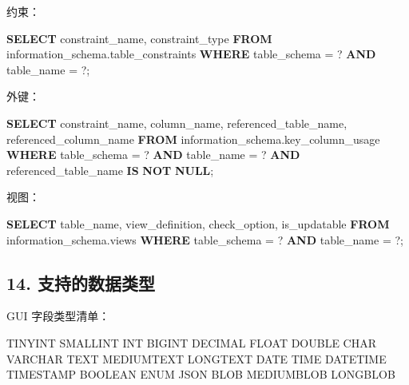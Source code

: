 \documentclass[
  a4paper,
  UTF8]{ctexart}
\newenvironment{Shaded}{}{}
\newcommand{\KeywordTok}[1]{\textcolor[rgb]{0.00,0.44,0.13}{\textbf{#1}}}
\newcommand{\NormalTok}[1]{#1}
\newcommand{\OperatorTok}[1]{\textcolor[rgb]{0.40,0.40,0.40}{#1}}
\begin{document}
约束：

\begin{Shaded}
\begin{Highlighting}[]
\KeywordTok{SELECT}
\NormalTok{  constraint\_name,}
\NormalTok{  constraint\_type}
\KeywordTok{FROM}\NormalTok{ information\_schema.table\_constraints}
\KeywordTok{WHERE}\NormalTok{ table\_schema }\OperatorTok{=}\NormalTok{ ?}
  \KeywordTok{AND}\NormalTok{ table\_name }\OperatorTok{=}\NormalTok{ ?;}
\end{Highlighting}
\end{Shaded}

外键：

\begin{Shaded}
\begin{Highlighting}[]
\KeywordTok{SELECT}
\NormalTok{  constraint\_name,}
\NormalTok{  column\_name,}
\NormalTok{  referenced\_table\_name,}
\NormalTok{  referenced\_column\_name}
\KeywordTok{FROM}\NormalTok{ information\_schema.key\_column\_usage}
\KeywordTok{WHERE}\NormalTok{ table\_schema }\OperatorTok{=}\NormalTok{ ?}
  \KeywordTok{AND}\NormalTok{ table\_name }\OperatorTok{=}\NormalTok{ ?}
  \KeywordTok{AND}\NormalTok{ referenced\_table\_name }\KeywordTok{IS} \KeywordTok{NOT} \KeywordTok{NULL}\NormalTok{;}
\end{Highlighting}
\end{Shaded}

视图：

\begin{Shaded}
\begin{Highlighting}[]
\KeywordTok{SELECT}\NormalTok{ table\_name, view\_definition, check\_option, is\_updatable}
\KeywordTok{FROM}\NormalTok{ information\_schema.views}
\KeywordTok{WHERE}\NormalTok{ table\_schema }\OperatorTok{=}\NormalTok{ ?}
  \KeywordTok{AND}\NormalTok{ table\_name }\OperatorTok{=}\NormalTok{ ?;}
\end{Highlighting}
\end{Shaded}

\hypertarget{ux652fux6301ux7684ux6570ux636eux7c7bux578b}{%
\subsection{14.
支持的数据类型}\label{ux652fux6301ux7684ux6570ux636eux7c7bux578b}}

GUI 字段类型清单：

\begin{Shaded}
\begin{Highlighting}[]
\NormalTok{TINYINT}
\NormalTok{SMALLINT}
\NormalTok{INT}
\NormalTok{BIGINT}
\NormalTok{DECIMAL}
\NormalTok{FLOAT}
\NormalTok{DOUBLE}
\NormalTok{CHAR}
\NormalTok{VARCHAR}
\NormalTok{TEXT}
\NormalTok{MEDIUMTEXT}
\NormalTok{LONGTEXT}
\NormalTok{DATE}
\NormalTok{TIME}
\NormalTok{DATETIME}
\NormalTok{TIMESTAMP}
\NormalTok{BOOLEAN}
\NormalTok{ENUM}
\NormalTok{JSON}
\NormalTok{BLOB}
\NormalTok{MEDIUMBLOB}
\NormalTok{LONGBLOB}
\end{Highlighting}
\end{Shaded}
\end{document}

